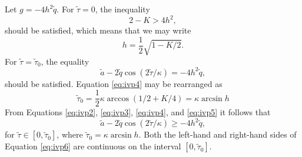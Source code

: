 Let $g = - 4 h^2 \tilde q$.
For $\tilde \tau = 0$, the inequality
%
\begin{equation}
\label{eq:ivp2}
2 - K > 4 h^2,
\end{equation}
%
should be satisfied, which means that we may write
%
\begin{equation}
\label{eq:ivp3}
h = \frac{1}{2}\sqrt{1 - K/2}.
\end{equation}
%
For $\tilde \tau = \tilde \tau_0$, the equality
%
\begin{equation}
\label{eq:ivp4}
\tilde{a} - 2\tilde{q}\cos(2\tilde{\tau}/\kappa) = - 4h^2\tilde{q},
\end{equation}
%
should be satisfied.
Equation \eqref{eq:ivp4} may be rearranged as
%
\begin{equation}
\label{eq:ivp5}
\tilde \tau_0 = \frac{1}{2} \kappa \arccos(1/2 + K/4) = \kappa \arcsin h
\end{equation}
%
From Equations \eqref{eq:ivp2}, \eqref{eq:ivp3}, \eqref{eq:ivp4}, and \eqref{eq:ivp5} it follows that 
%
\begin{equation}
\label{eq:ivp6}
\tilde{a} - 2\tilde{q}\cos(2\tilde{\tau}/\kappa) \geq - 4h^2\tilde{q},
\end{equation}
%
for $\tilde{\tau} \in [0,\tilde{\tau}_0]$, where $\tilde \tau_0 = \kappa \arcsin h$.
Both the left-hand and right-hand sides of Equation \eqref{eq:ivp6} are continuous on the interval $[0,\tilde{\tau}_0]$.

